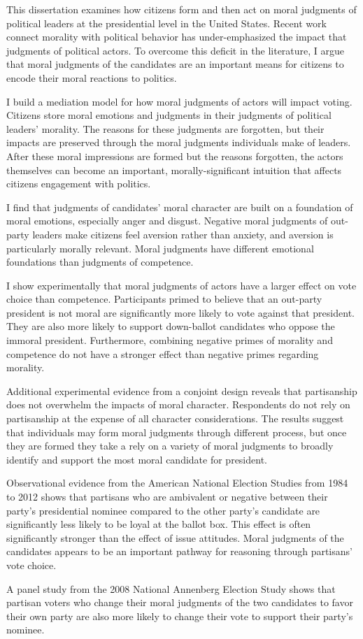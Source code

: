 This dissertation examines how citizens form and then act on moral judgments of political leaders at the presidential level in the United States. Recent work connect morality with political behavior has under-emphasized the impact that judgments of political actors. To overcome this deficit in the literature, I argue that moral judgments of the candidates are an important means for citizens to encode their moral reactions to politics. 

I build a mediation model for how moral judgments of actors will impact voting. Citizens store moral emotions and judgments in their judgments of political leaders' morality. The reasons for these judgments are forgotten, but their impacts are preserved through the moral judgments individuals make of leaders. After these moral impressions are formed but the reasons forgotten, the actors themselves can become an important, morally-significant intuition that affects citizens engagement with politics.

I find that judgments of candidates' moral character are built on a foundation of moral emotions, especially anger and disgust. Negative moral judgments of out-party leaders make citizens feel aversion rather than anxiety, and aversion is particularly morally relevant. Moral judgments have different emotional foundations than judgments of competence.

I show experimentally that moral judgments of actors have a larger effect on vote choice than competence. Participants primed to believe that an out-party president is not moral are significantly more likely to vote against that president. They are also more likely to support down-ballot candidates who oppose the immoral president. Furthermore, combining negative primes of morality and competence do not have a stronger effect than negative primes regarding morality.

Additional experimental evidence from a conjoint design reveals that partisanship does not overwhelm the impacts of moral character. Respondents do not rely on partisanship at the expense of all character considerations. The results suggest that individuals may form moral judgments through different process, but once they are formed they take a rely on a variety of moral judgments to broadly identify and support the most moral candidate for president.

Observational evidence from the American National Election Studies from 1984 to 2012 shows that partisans who are ambivalent or negative between their party's presidential nominee compared to the other party's candidate are significantly less likely to be loyal at the ballot box. This effect is often significantly stronger than the effect of issue attitudes. Moral judgments of the candidates appears to be an important pathway for reasoning through partisans' vote choice.

A panel study from the 2008 National Annenberg Election Study shows that partisan voters who change their moral judgments of the two candidates to favor their own party are also more likely to change their vote to support their party's nominee. 
